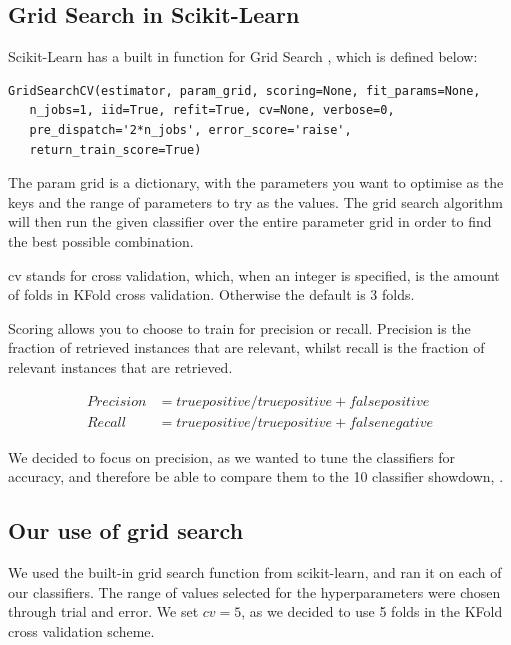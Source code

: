 \documentclass{article}
\begin{document}
	\subsection{Grid Search in Scikit-Learn}
	
		Scikit-Learn has a built in function for Grid Search \cite{gridsearch}, which is defined below:
		
		
	\begin{lstlisting}
GridSearchCV(estimator, param_grid, scoring=None, fit_params=None, 
   n_jobs=1, iid=True, refit=True, cv=None, verbose=0, 
   pre_dispatch='2*n_jobs', error_score='raise',
   return_train_score=True)
	\end{lstlisting}
		
		The param \textunderscore grid is a dictionary, with the parameters you want to optimise as the keys and the range of parameters to try as the values. The grid search algorithm will then run the given classifier over the entire parameter grid in order to find the best possible combination. 
		
	cv stands for cross validation, which, when an integer is specified, is the amount of folds in KFold cross validation. Otherwise the default is 3 folds. 

		Scoring allows you to choose to train for precision or recall. Precision is the fraction of retrieved instances that are relevant, whilst recall is the fraction of relevant instances that are retrieved.
		
		\begin{align*}
		Precision &= true positive / true positive + false positive\\
		Recall &= true positive / true positive + false negative 
		\end{align*}
		
		We decided to focus on precision, as we wanted to tune the classifiers for accuracy, and therefore be able to compare them to the 10 classifier showdown, \cite{showdown}. 
		
\subsection{Our use of grid search}

		We used the built-in grid search function from scikit-learn, and ran it on each of our classifiers. The range of values selected for the hyperparameters were chosen through trial and error. We set $cv=5$, as we decided to use 5 folds in the KFold cross validation scheme. 
\\
\end{document}
